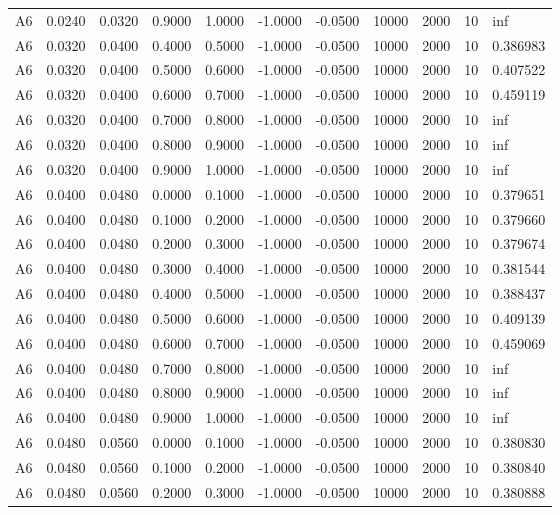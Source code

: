 \documentclass{article}
\begin{document}
\begin{longtable}{l r r r r r r r r r l}
A6 & 0.0240 & 0.0320 & 0.9000 & 1.0000 & -1.0000 & -0.0500 & 10000 & 2000 & 10 & inf \\
A6 & 0.0320 & 0.0400 & 0.4000 & 0.5000 & -1.0000 & -0.0500 & 10000 & 2000 & 10 & 0.386983 \\
A6 & 0.0320 & 0.0400 & 0.5000 & 0.6000 & -1.0000 & -0.0500 & 10000 & 2000 & 10 & 0.407522 \\
A6 & 0.0320 & 0.0400 & 0.6000 & 0.7000 & -1.0000 & -0.0500 & 10000 & 2000 & 10 & 0.459119 \\
A6 & 0.0320 & 0.0400 & 0.7000 & 0.8000 & -1.0000 & -0.0500 & 10000 & 2000 & 10 & inf \\
A6 & 0.0320 & 0.0400 & 0.8000 & 0.9000 & -1.0000 & -0.0500 & 10000 & 2000 & 10 & inf \\
A6 & 0.0320 & 0.0400 & 0.9000 & 1.0000 & -1.0000 & -0.0500 & 10000 & 2000 & 10 & inf \\
A6 & 0.0400 & 0.0480 & 0.0000 & 0.1000 & -1.0000 & -0.0500 & 10000 & 2000 & 10 & 0.379651 \\
A6 & 0.0400 & 0.0480 & 0.1000 & 0.2000 & -1.0000 & -0.0500 & 10000 & 2000 & 10 & 0.379660 \\
A6 & 0.0400 & 0.0480 & 0.2000 & 0.3000 & -1.0000 & -0.0500 & 10000 & 2000 & 10 & 0.379674 \\
A6 & 0.0400 & 0.0480 & 0.3000 & 0.4000 & -1.0000 & -0.0500 & 10000 & 2000 & 10 & 0.381544 \\
A6 & 0.0400 & 0.0480 & 0.4000 & 0.5000 & -1.0000 & -0.0500 & 10000 & 2000 & 10 & 0.388437 \\
A6 & 0.0400 & 0.0480 & 0.5000 & 0.6000 & -1.0000 & -0.0500 & 10000 & 2000 & 10 & 0.409139 \\
A6 & 0.0400 & 0.0480 & 0.6000 & 0.7000 & -1.0000 & -0.0500 & 10000 & 2000 & 10 & 0.459069 \\
A6 & 0.0400 & 0.0480 & 0.7000 & 0.8000 & -1.0000 & -0.0500 & 10000 & 2000 & 10 & inf \\
A6 & 0.0400 & 0.0480 & 0.8000 & 0.9000 & -1.0000 & -0.0500 & 10000 & 2000 & 10 & inf \\
A6 & 0.0400 & 0.0480 & 0.9000 & 1.0000 & -1.0000 & -0.0500 & 10000 & 2000 & 10 & inf \\
A6 & 0.0480 & 0.0560 & 0.0000 & 0.1000 & -1.0000 & -0.0500 & 10000 & 2000 & 10 & 0.380830 \\
A6 & 0.0480 & 0.0560 & 0.1000 & 0.2000 & -1.0000 & -0.0500 & 10000 & 2000 & 10 & 0.380840 \\
A6 & 0.0480 & 0.0560 & 0.2000 & 0.3000 & -1.0000 & -0.0500 & 10000 & 2000 & 10 & 0.380888 \\

\end{longtable}
\end{document}
